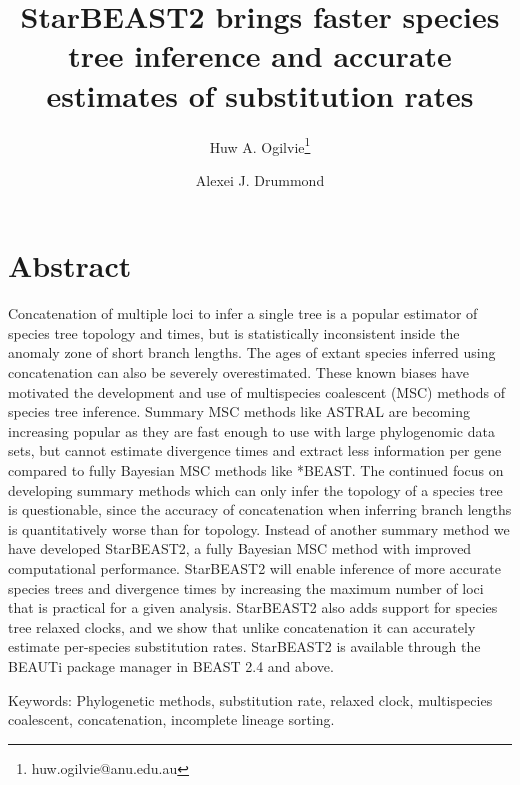 \documentclass[12pt]{article}
\begin{document}
\title{StarBEAST2 brings faster species tree inference and accurate estimates of substitution rates}
\author[1,2]{Huw A. Ogilvie\thanks{huw.ogilvie@anu.edu.au}}
\author[2,3]{Alexei J. Drummond}

\maketitle

\clearpage

\justifying

\section*{Abstract}

Concatenation of multiple loci to infer a single tree is a popular estimator of
species tree topology and times, but is statistically inconsistent inside the
anomaly zone of short branch lengths. The ages of extant species inferred using
concatenation can also be severely overestimated. These known biases have
motivated the development and use of multispecies coalescent (MSC) methods of
species tree inference. Summary MSC methods like ASTRAL are becoming increasing
popular as they are fast enough to use with large phylogenomic data sets, but
cannot estimate divergence times and extract less information per gene compared
to fully Bayesian MSC methods like *BEAST. The continued focus on developing
summary methods which can only infer the topology of a species tree is
questionable, since the accuracy of concatenation when inferring branch lengths
is quantitatively worse than for topology. Instead of another summary method we
have developed StarBEAST2, a fully Bayesian MSC method with improved
computational performance. StarBEAST2 will enable inference of more accurate
species trees and divergence times by increasing the maximum number of loci that
is practical for a given analysis. StarBEAST2 also adds support for species tree
relaxed clocks, and we show that unlike concatenation it can accurately estimate
per-species substitution rates. StarBEAST2 is available through the BEAUTi
package manager in BEAST 2.4 and above.

Keywords: Phylogenetic methods, substitution rate, relaxed clock, multispecies coalescent, concatenation, incomplete lineage sorting.
\end{document}
